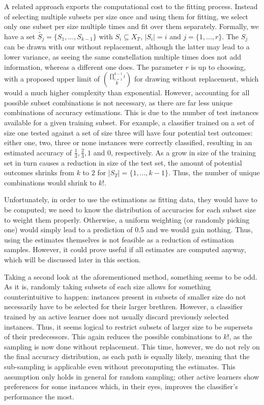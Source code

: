 A related approach exports the computational cost to the fitting process. Instead of selecting multiple subsets per size once and using them for fitting, we select only one subset per size multiple times and fit over them separately. Formally, we have a set $\tilde{S_j} = \{S_1,...,S_{k-1}\}$ with $S_i \subseteq X_T$, $|S_i| = i$ and $j = \{1,...,r\}$. The $S_j$ can be drawn with our without replacement, although the latter may lead to a lower variance, as seeing the same constellation multiple times does not add information, whereas a different one does. The parameter $r$ is up to choosing, with a proposed upper limit of $\prod_{i=1}^{k-1} i \choose k$ for drawing without replacement, which would a much higher complexity than exponential. However, accounting for all possible subset combinations is not necessary, as there are far less unique combinations of accuracy estimations. This is due to the number of test instances available for a given training subset. For example, a classifier trained on a set of size one tested against a set of size three will have four potential test outcomes: either one, two, three or none instances were correctly classified, resulting in an estimated accuracy of $\frac{1}{3}, \frac{2}{3}, 1$ and $0$, respectively. As a grow in size of the training set in turn causes a reduction in size of the test set, the amount of potential outcomes shrinks from $k$ to $2$ for $|S_T| = \{1, ..., k-1\}$. Thus, the number of unique combinations would shrink to $k!$.

Unfortunately, in order to use the estimations as fitting data, they would have to be computed; we need to know the distribution of accuracies for each subset size to weight them properly. Otherwise, a uniform weighting (or randomly picking one) would simply lead to a prediction of 0.5 and we would gain nothing. Thus, using the estimates themselves is not feasible as a reduction of estimation samples. However, it could prove useful if all estimates are computed anyway, which will be discussed later in this section.

Taking a second look at the aforementioned method, something seems to be odd. As it is, randomly taking subsets of each size allows for something counterintuitive to happen: instances present in subsets of smaller size do not necessarily have to be selected for their larger brethren. However, a classifier trained by an active learner does not usually discard previously selected instances. Thus, it seems logical to restrict subsets of larger size to be supersets of their predecessors. This again reduces the possible combinations to $k!$, as the sampling is now done without replacement. This time, however, we do not rely on the final accuracy distribution, as each path is equally likely, meaning that the sub-sampling is applicable even without precomputing the estimates. This assumption only holds in general for random sampling; other active learners show preferences for some instances which, in their eyes, improves the classifier's performance the most.

